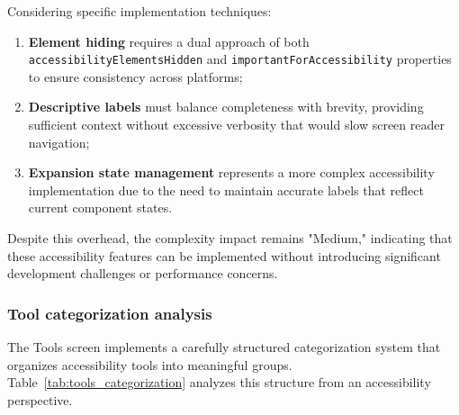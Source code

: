 Considering specific implementation techniques:

\begin{enumerate}
    \item \textbf{Element hiding} requires a dual approach of both \texttt{accessibilityElementsHidden} and \texttt{importantForAccessibility} properties to ensure consistency across platforms;
    
    \item \textbf{Descriptive labels} must balance completeness with brevity, providing sufficient context without excessive verbosity that would slow screen reader navigation;
    
    \item \textbf{Expansion state management} represents a more complex accessibility implementation due to the need to maintain accurate labels that reflect current component states.
\end{enumerate}

Despite this overhead, the complexity impact remains "Medium," indicating that these accessibility features can be implemented without introducing significant development challenges or performance concerns.

\subsubsection{Tool categorization analysis}

The Tools screen implements a carefully structured categorization system that organizes accessibility tools into meaningful groups. Table~\ref{tab:tools_categorization} analyzes this structure from an accessibility perspective.

